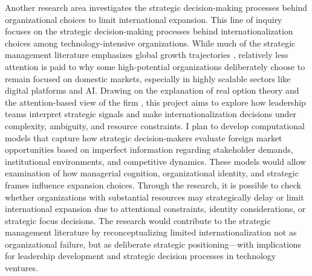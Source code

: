 \documentclass[11pt,a4paper]{article}
\begin{document}
Another research area investigates the strategic decision-making processes behind organizational choices to limit international expansion.
This line of inquiry focuses on the strategic decision-making processes behind internationalization choices among technology-intensive organizations. 
While much of the strategic management literature emphasizes global growth trajectories \parencite{Cuervo-Cazurra2015InternationalizationEscape}, relatively less attention is paid to why some high-potential organizations deliberately choose to remain focused on domestic markets, especially in highly scalable sectors like digital platforms and AI. 
Drawing on the explanation of real option theory \parencite{Brouthers2008RealPerformance} and the attention-based view of the firm \parencite{March1991ExplorationLearning}, this project aims to explore how leadership teams interpret strategic signals and make internationalization decisions under complexity, ambiguity, and resource constraints. 
I plan to develop computational models that capture how strategic decision-makers evaluate foreign market opportunities based on imperfect information regarding stakeholder demands, institutional environments, and competitive dynamics. 
These models would allow examination of how managerial cognition, organizational identity, and strategic frames influence expansion choices. 
Through the research, it is possible to check whether organizations with substantial resources may strategically delay or limit international expansion due to attentional constraints, identity considerations, or strategic focus decisions. 
The research would contribute to the strategic management literature by reconceptualizing limited internationalization not as organizational failure, but as deliberate strategic positioning—with implications for leadership development and strategic decision processes in technology ventures.
\end{document}
